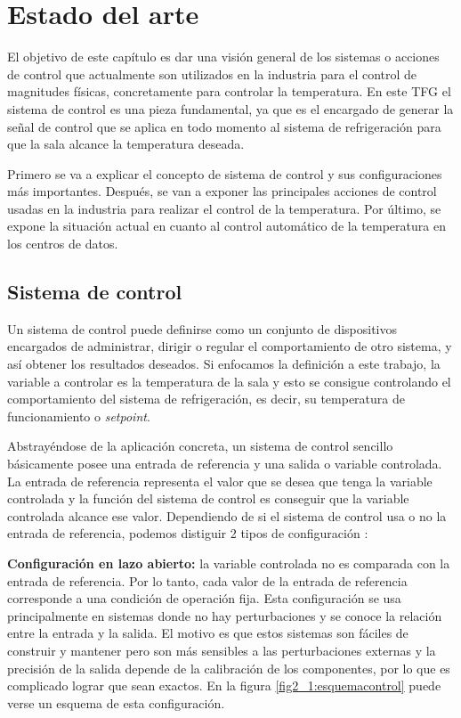  \chapter{Estado del arte}\label{cap:estadoarte}

	El objetivo de este capítulo es dar una visión general de los sistemas o acciones de control que actualmente son utilizados en la industria para el control de magnitudes físicas, concretamente para controlar la temperatura. En este TFG el sistema de control es una pieza fundamental, ya que es el encargado de generar la señal de control que se aplica en todo momento al sistema de refrigeración para que la sala alcance la temperatura deseada.

	Primero se va a explicar el concepto de sistema de control y sus configuraciones más importantes. Después, se van a exponer las principales acciones de control usadas en la industria para realizar el control de la temperatura. Por último, se expone la situación actual en cuanto al control automático de la temperatura en los centros de datos.

\section{Sistema de control}

	Un sistema de control puede definirse como un conjunto de dispositivos encargados de administrar, dirigir o regular el comportamiento de otro sistema, y así obtener los resultados deseados. Si enfocamos la definición a este trabajo, la variable a controlar es la temperatura de la sala y esto se consigue controlando el comportamiento del sistema de refrigeración, es decir, su temperatura de funcionamiento o \textit{setpoint}. 

	Abstrayéndose de la aplicación concreta, un sistema de control sencillo básicamente posee una entrada de referencia y una salida o variable controlada. La entrada de referencia representa el valor que se desea que tenga la variable controlada y la función del sistema de control es conseguir que la variable controlada alcance ese valor. Dependiendo de si el sistema de control usa o no la entrada de referencia, podemos distiguir 2 tipos de configuración \cite{control1}:

	\textbf{Configuración en lazo abierto:} la variable controlada no es comparada con la entrada de referencia. Por lo tanto, cada valor de la entrada de referencia corresponde a una condición de operación fija. Esta configuración se usa principalmente en sistemas donde no hay perturbaciones y se conoce la relación entre la entrada y la salida. El motivo es que estos sistemas son fáciles de construir y mantener pero son más sensibles a las perturbaciones externas y la precisión de la salida depende de la calibración de los componentes, por lo que es complicado lograr que sean exactos. En la figura \ref{fig2_1:esquemacontrol} puede verse un esquema de esta configuración.

